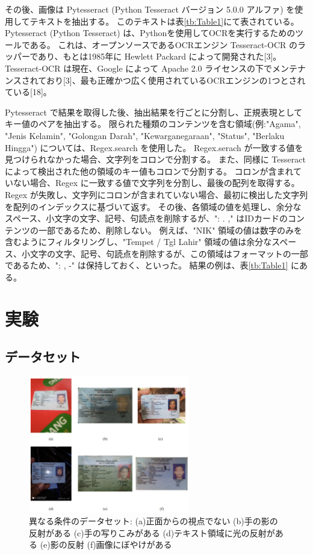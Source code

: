 \documentclass[uplatex, twocolumn,10pt]{jsarticle}
\begin{document}
その後、画像は Pytesseract (Python Tesseract バージョン 5.0.0 アルファ) を使用してテキストを抽出する。
このテキストは表\ref{tb:Table1}にて表されている。
Pytesseract (Python Tesseract) は、Pythonを使用してOCRを実行するためのツールである。
これは、オープンソースであるOCRエンジン Tesseract-OCR のラッパーであり、もとは1985年に Hewlett Packard によって開発された[3]。
Tesseract-OCR は現在、Google によって Apache 2.0 ライセンスの下でメンテナンスされており[3]、最も正確かつ広く使用されているOCRエンジンの1つとされている[18]。

Pytesseract で結果を取得した後、抽出結果を行ごとに分割し、正規表現としてキー値のペアを抽出する。
限られた種類のコンテンツを含む領域(例:"Agama", "Jenis Kelamin", "Golongan Darah", "Kewarganegaraan", "Status", "Berlaku Hingga") については、Regex.search を使用した。
Regex.serach が一致する値を見つけられなかった場合、文字列をコロンで分割する。
また、同様に Tesseract によって検出された他の領域のキー値もコロンで分割する。
コロンが含まれていない場合、Regex に一致する値で文字列を分割し、最後の配列を取得する。
Regex が失敗し、文字列にコロンが含まれていない場合、最初に検出した文字列を配列のインデックスに基づいて返す。
その後、各領域の値を処理し、余分なスペース、小文字の文字、記号、句読点を削除するが、": . ," はIDカードのコンテンツの一部であるため、削除しない。
例えば、"NIK" 領域の値は数字のみを含むようにフィルタリングし、"Tempet / Tgl Lahir" 領域の値は余分なスペース、小文字の文字、記号、句読点を削除するが、この領域はフォーマットの一部であるため、": , -" は保持しておく、といった。
結果の例は、表\ref{tb:Table1} にある。



\section{実験}\label{sec:Experiment}


\subsection{データセット}

\begin{figure}[t]
    \begin{center}
        \includegraphics*[width=7cm]{image/Figure4.png}
        \caption{異なる条件のデータセット: (a)正面からの視点でない (b)手の影の反射がある (c)手の写りこみがある (d)テキスト領域に光の反射がある (e)影の反射 (f)画像にぼやけがある}
        \label{fig:Figure4}
    \end{center}
\end{figure}
\end{document}

